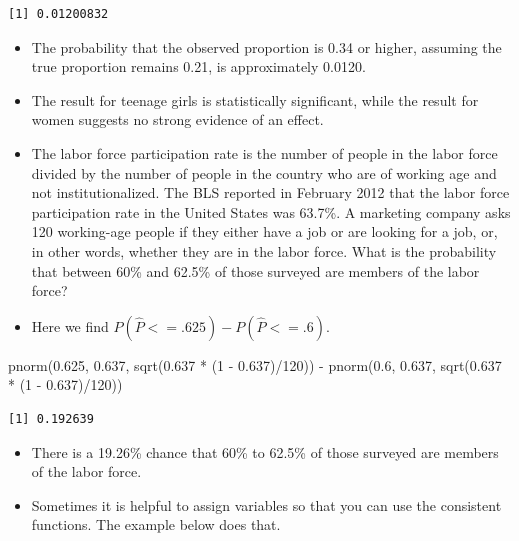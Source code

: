 \documentclass[
  letterpaper,
  DIV=11,
  numbers=noendperiod]{scrreprt}
\newenvironment{Shaded}{\begin{snugshade}}{\end{snugshade}}
\newcommand{\DecValTok}[1]{\textcolor[rgb]{0.68,0.00,0.00}{#1}}
\newcommand{\FloatTok}[1]{\textcolor[rgb]{0.68,0.00,0.00}{#1}}
\newcommand{\FunctionTok}[1]{\textcolor[rgb]{0.28,0.35,0.67}{#1}}
\newcommand{\NormalTok}[1]{\textcolor[rgb]{0.00,0.23,0.31}{#1}}
\newcommand{\SpecialCharTok}[1]{\textcolor[rgb]{0.37,0.37,0.37}{#1}}
\begin{document}
\begin{verbatim}
[1] 0.01200832
\end{verbatim}

\begin{itemize}
\item
  The probability that the observed proportion is 0.34 or higher,
  assuming the true proportion remains 0.21, is approximately 0.0120.
\item
  The result for teenage girls is statistically significant, while the
  result for women suggests no strong evidence of an effect.
\item
  The labor force participation rate is the number of people in the
  labor force divided by the number of people in the country who are of
  working age and not institutionalized. The BLS reported in February
  2012 that the labor force participation rate in the United States was
  63.7\%. A marketing company asks 120 working-age people if they either
  have a job or are looking for a job, or, in other words, whether they
  are in the labor force. What is the probability that between 60\% and
  62.5\% of those surveyed are members of the labor force?
\item
  Here we find \(P(\hat{P} <= .625)-P(\hat{P} <= .6)\).
\end{itemize}

\begin{Shaded}
\begin{Highlighting}[]
\FunctionTok{pnorm}\NormalTok{(}\FloatTok{0.625}\NormalTok{, }\FloatTok{0.637}\NormalTok{, }\FunctionTok{sqrt}\NormalTok{(}\FloatTok{0.637} \SpecialCharTok{*}\NormalTok{ (}\DecValTok{1} \SpecialCharTok{{-}} \FloatTok{0.637}\NormalTok{)}\SpecialCharTok{/}\DecValTok{120}\NormalTok{)) }\SpecialCharTok{{-}} \FunctionTok{pnorm}\NormalTok{(}\FloatTok{0.6}\NormalTok{, }\FloatTok{0.637}\NormalTok{,}
    \FunctionTok{sqrt}\NormalTok{(}\FloatTok{0.637} \SpecialCharTok{*}\NormalTok{ (}\DecValTok{1} \SpecialCharTok{{-}} \FloatTok{0.637}\NormalTok{)}\SpecialCharTok{/}\DecValTok{120}\NormalTok{))}
\end{Highlighting}
\end{Shaded}

\begin{verbatim}
[1] 0.192639
\end{verbatim}

\begin{itemize}
\item
  There is a 19.26\% chance that 60\% to 62.5\% of those surveyed are
  members of the labor force.
\item
  Sometimes it is helpful to assign variables so that you can use the
  consistent functions. The example below does that.\\
\end{itemize}
\end{document}
